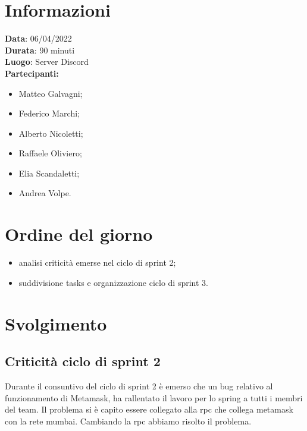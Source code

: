 \documentclass[a4paper, 12pt]{article}
\begin{document}
\makefrontpage

\section{Informazioni}
\textbf{Data}: 06/04/2022\\
\textbf{Durata}: 90 minuti\\
\textbf{Luogo}: Server Discord\\

\textbf{Partecipanti:}
\begin{itemize}
	\item Matteo Galvagni;
	\item Federico Marchi;
	\item Alberto Nicoletti;
	\item Raffaele Oliviero;
	\item Elia Scandaletti;
	\item Andrea Volpe.
\end{itemize}


\section{Ordine del giorno}
\begin{itemize}
	\item analisi criticità emerse nel ciclo di sprint 2;
	\item suddivisione tasks e organizzazione ciclo di sprint 3.
\end{itemize}

\section{Svolgimento}

\subsection{Criticità ciclo di sprint 2}
Durante il consuntivo del ciclo di sprint 2 è emerso che un bug relativo al funzionamento di Metamask, ha rallentato il lavoro per lo spring a tutti i membri del team.
Il problema si è capito essere collegato alla rpc che collega metamask con la rete mumbai. Cambiando la rpc abbiamo risolto il problema.
\end{document}

